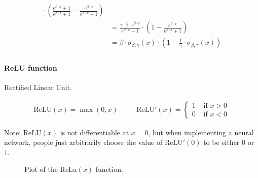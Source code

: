 \documentclass[titlepage]{article}
\begin{document}
\begin{align*}
{                  }
                  \cdot
                  \left(
                    \frac{e^{\beta \cdot x} + 1}{e^{\beta \cdot x} + 1}
                    -
                    \frac{e^{\beta \cdot x}}{e^{\beta \cdot x} + 1}
                  \right) \\
              & = \frac{
                    \gamma \cdot \beta \cdot e^{\beta \cdot x}
                  }{
                    e^{\beta \cdot x} + 1
                  }
                  \cdot
                  \left(
                    1 - \frac{e^{\beta \cdot x}}{e^{\beta \cdot x} + 1}
                  \right) \\
              & = \beta \cdot \sigma_{\beta, \gamma} (x)
                  \cdot
                  \left(
                    1 - \frac{1}{\gamma} \cdot \sigma_{\beta, \gamma} (x)
                  \right) \\
          \end{align*}

        \paragraph{ReLU function}

          Rectified Linear Unit.

          \begin{align*}
            \text{ReLU} (x) = \max(0, x)
            & \quad &
            \text{ReLU}' (x) =
              \begin{cases}
                1 & \text{ if } x > 0 \\
                0 & \text{ if } x < 0
              \end{cases}
          \end{align*}

          Note: $\text{ReLU}(x)$ is not differentiable at $x=0$, but when
          implementing a neural network, people just arbitrarily choose the
          value of $\text{ReLU}'(0)$ to be either $0$ or $1$.

          \begin{figure}[!htb]
            \centering
            \caption{%
              Plot of the $\text{ReLu}(x)$ function.
            }
          \end{figure}
\end{document}
